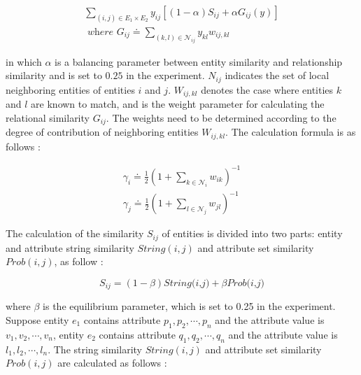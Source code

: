 \documentclass[sigconf]{acmart}
\begin{document}
{\begin{equation}
    \begin{array}{l}
    \sum_{(i, j) \in E_{1} \times E_{2}} y_{i j}\left[(1-\alpha) S_{i j}+\alpha G_{i j}(y)\right] \\
    \textit { where } G_{i j} \doteq \sum_{(k, l) \in \mathcal{N}_{i j}} y_{k l} w_{i j, k l}
    \end{array}
\end{equation}

in which $\alpha$  is a balancing parameter between entity similarity and relationship similarity and is set to $0.25$ in the experiment. $N_{ij}$ indicates the set of local neighboring entities of entities $i$ and $j$. $W_{ij,kl}$ denotes the case where entities $k$ and $l$ are known to match, and is the weight parameter for calculating the relational similarity $G_{ij}$. The weights need to be determined according to the degree of contribution of neighboring entities $W_{ij,kl}$. The calculation formula is as follows : 

\begin{equation}
    \begin{array}{l}
    \gamma_{i} \doteq \frac{1}{2}\left(1+\sum_{k \in \mathcal{N}_{i}} w_{i k}\right)^{-1} \\
    \gamma_{j} \doteq \frac{1}{2}\left(1+\sum_{l \in \mathcal{N}_{j}} w_{j l}\right)^{-1}
    \end{array}
\end{equation}

The calculation of the similarity $S_{ij}$ of entities is divided into two parts: entity and attribute string similarity $String(i,j)$ and attribute set similarity $Prob(i,j)$, as follow :

\begin{equation}
    S_{ij} = (1-\beta)\textit{String(i,j)} + \beta \textit{Prob(i,j)}
\end{equation}

where $\beta$ is the equilibrium parameter, which is set to 0.25 in the experiment. Suppose entity $e_1$ contains attribute $p_1,p_2,\cdots,p_n$ and the attribute value is $v_1,v_2,\cdots,v_n$, entity $e_2$ contains attribute $q_1,q_2,\cdots,q_n$ and the attribute value is $l_1,l_2,\cdots,l_n$. The string similarity $String(i,j)$ and attribute set similarity $Prob(i,j)$ are calculated as follows :

}
\end{document}

